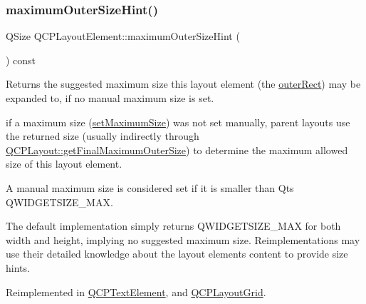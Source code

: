 \mbox{\label{class_q_c_p_layout_element_ad96efb977a26e360e8a64a4c1e56456d}} 
\subsubsection{\texorpdfstring{maximumOuterSizeHint()}{maximumOuterSizeHint()}}
{\footnotesize\ttfamily Q\+Size Q\+C\+P\+Layout\+Element\+::maximum\+Outer\+Size\+Hint (\begin{DoxyParamCaption}{ }\end{DoxyParamCaption}) const\hspace{0.3cm}{\ttfamily [virtual]}}

Returns the suggested maximum size this layout element (the \mbox{\hyperlink{class_q_c_p_layout_element_a2a32a12a6161c9dffbadeb9cc585510c}{outer\+Rect}}) may be expanded to, if no manual maximum size is set.

if a maximum size (\mbox{\hyperlink{class_q_c_p_layout_element_a74eb5280a737ab44833d506db65efd95}{set\+Maximum\+Size}}) was not set manually, parent layouts use the returned size (usually indirectly through \mbox{\hyperlink{class_q_c_p_layout_add49fd6843821a6126914b837ed52e22}{Q\+C\+P\+Layout\+::get\+Final\+Maximum\+Outer\+Size}}) to determine the maximum allowed size of this layout element.

A manual maximum size is considered set if it is smaller than Qt\textquotesingle{}s {\ttfamily Q\+W\+I\+D\+G\+E\+T\+S\+I\+Z\+E\+\_\+\+M\+AX}.

The default implementation simply returns {\ttfamily Q\+W\+I\+D\+G\+E\+T\+S\+I\+Z\+E\+\_\+\+M\+AX} for both width and height, implying no suggested maximum size. Reimplementations may use their detailed knowledge about the layout element\textquotesingle{}s content to provide size hints. 

Reimplemented in \mbox{\hyperlink{class_q_c_p_text_element_ae82475b50c10a5b3314d996d50ae536b}{Q\+C\+P\+Text\+Element}}, and \mbox{\hyperlink{class_q_c_p_layout_grid_a41ce0014c220d77b909e2ca937f0e599}{Q\+C\+P\+Layout\+Grid}}.

\mbox{\label{class_q_c_p_layout_element_afb9503858d4aa0f3b9f1794b084fb40a}} 
